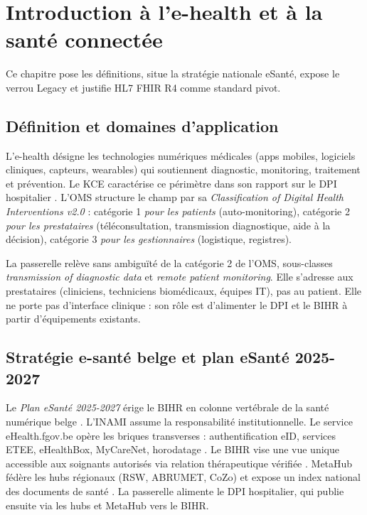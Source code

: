 \chapter{Introduction à l'e-health et à la santé connectée}
\label{ch:ehealth}

Ce chapitre pose les définitions, situe la stratégie nationale eSanté, expose le verrou Legacy et justifie HL7 FHIR R4 comme standard pivot.

\section{Définition et domaines d'application}
\label{sec:ehealth-definition}

L'e-health désigne les technologies numériques médicales (apps mobiles, logiciels cliniques, capteurs, wearables) qui soutiennent diagnostic, monitoring, traitement et prévention. Le KCE caractérise ce périmètre dans son rapport sur le DPI hospitalier \cite{kce_362_dpi}. L'OMS structure le champ par sa \emph{Classification of Digital Health Interventions v2.0} \cite{oms_dhi_2023} : catégorie 1 \emph{pour les patients} (auto-monitoring), catégorie 2 \emph{pour les prestataires} (téléconsultation, transmission diagnostique, aide à la décision), catégorie 3 \emph{pour les gestionnaires} (logistique, registres).

\begin{bridgeinfo}
La passerelle relève sans ambiguïté de la catégorie 2 de l'OMS, sous-classes \emph{transmission of diagnostic data} et \emph{remote patient monitoring}. Elle s'adresse aux prestataires (cliniciens, techniciens biomédicaux, équipes IT), pas au patient. Elle ne porte pas d'interface clinique : son rôle est d'alimenter le DPI et le BIHR à partir d'équipements existants.
\end{bridgeinfo}

\section{Stratégie e-santé belge et plan eSanté 2025-2027}
\label{sec:ehealth-belge}

Le \emph{Plan eSanté 2025-2027} érige le BIHR en colonne vertébrale de la santé numérique belge \cite{plan_esante_2025_2027}. L'INAMI assume la responsabilité institutionnelle. Le service eHealth.fgov.be opère les briques transverses : authentification eID, services ETEE, eHealthBox, MyCareNet, horodatage \cite{ehealth_services_base}. Le BIHR vise une vue unique accessible aux soignants autorisés via relation thérapeutique vérifiée \cite{bihr_overview}. MetaHub fédère les hubs régionaux (RSW, ABRUMET, CoZo) et expose un index national des documents de santé \cite{metahub_overview}. La passerelle alimente le DPI hospitalier, qui publie ensuite via les hubs et MetaHub vers le BIHR.

